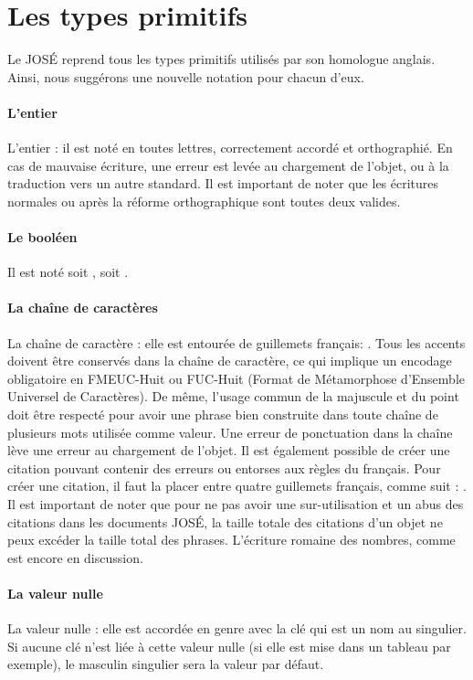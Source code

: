 \documentclass[french]{article}
\begin{document}
\section{Les types primitifs} {
    Le JOSÉ reprend tous les types primitifs utilisés par son homologue anglais. Ainsi, nous suggérons une nouvelle notation pour chacun d'eux.
    \paragraph{L'entier}{
L'entier : il est noté en toutes lettres, correctement accordé et orthographié. En cas de mauvaise écriture, une erreur est levée au chargement de l'objet, ou à la traduction vers un autre standard. Il est important de noter que les écritures normales ou après la réforme orthographique sont toutes deux valides. }
    \paragraph{Le booléen}{ Il est noté soit , soit .}
    \paragraph{La chaîne de caractères}{La chaîne de caractère : elle est entourée de guillemets français: \textquote{}. Tous les accents doivent être conservés dans la chaîne de caractère, ce qui implique un encodage obligatoire en FMEUC-Huit ou FUC-Huit (Format de Métamorphose d'Ensemble Universel de Caractères). De même, l'usage commun de la majuscule et du point doit être respecté pour avoir une phrase bien construite dans toute chaîne de plusieurs mots utilisée comme valeur. Une erreur de ponctuation dans la chaîne lève une erreur au chargement de l'objet. Il est également possible de créer une citation pouvant contenir des erreurs ou entorses aux règles du français. Pour créer une citation, il faut la placer entre quatre guillemets français, comme suit : . Il est important de noter que pour ne pas avoir une sur-utilisation et un abus des citations dans les documents JOSÉ, la taille totale des citations d'un objet ne peux excéder la taille total des phrases. L'écriture romaine des nombres, comme  est encore en discussion. }
    \paragraph{La valeur nulle}{La valeur nulle : elle est accordée en genre avec la clé qui est un nom au singulier. Si aucune clé n'est liée à cette valeur nulle (si elle est mise dans un tableau par exemple), le masculin singulier  sera la valeur par défaut.}
}
\end{document}
